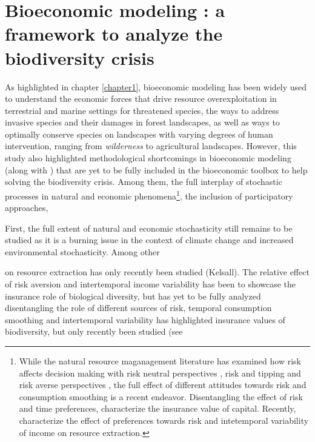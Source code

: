 \section*{Bioeconomic modeling : a framework to analyze the biodiversity crisis}

As highlighted in chapter \ref{chapter1}, bioeconomic modeling has been widely used to understand the economic forces that drive resource overexploitation in terrestrial and marine settings for threatened species, the ways to address invasive species and their damages in forest landscapes, as well as ways to optimally conserve species on landscapes with varying degrees of human intervention, ranging from \textit{wilderness} to agricultural landscapes. However, this study also highlighted methodological shortcomings in bioeconomic modeling (along with \cite{Drechsler20200}) that are yet to be fully included in the  bioeconomic toolbox to help solving the biodiversity crisis. Among them, the full interplay of stochastic processes in natural and economic phenomena\footnote{While the natural resource maganagement literature has examined how risk affects decision making with risk neutral perspectives \citep{reed_1979_optimal, costello_optimal_2008}, risk and tipping \citep{costello_renewable_2019} and risk averse perspectives \citep{McGoughPlantingaCostello+2009,kapaun_does_2013,TAHVONEN2018659}, the full effect of different attitudes towards risk and consumption smoothing is a recent endeavor. Disentangling the effect of risk and time preferences, \citep{quaas_2019_insurance, AugeraudVeron2019} characterize the insurance value of capital. Recently, \citep{KELSALL2023102855} characterize the effect of preferences towards risk and intetemporal variability of income on resource extraction.}, the inclusion of participatory approaches, 

\clearpage
First, the full extent of natural and economic stochasticity still remains to be studied as it is a burning issue in the context of climate change and increased environmental stochasticity.
   Among other 
  
  on resource extraction has only recently been studied (Kelsall). The relative effect of risk aversion and intertemporal income variability has been to showcase the insurance role of biological diversity, but has yet to be fully analyzed   disentangling the role of different sources of risk, temporal consumption smoothing and intertemporal variability has highlighted insurance values of biodiversity, but only recently been studied  (see 


